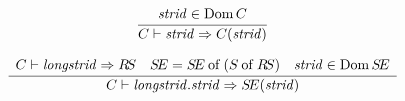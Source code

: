 


%



\begin{equation}	%
\label{idlongstrid-rule}
\frac{\begin{array}{lr}
	\strid\in\Dom \C
      \end{array}}
     {\C\ts\idlongid{\strid}\ra\C(\strid)}
\end{equation}

\begin{equation}	%
\label{dotlongstrid-rule}
\frac{\begin{array}{lcr}
      \C\ts\longstrid\ra\RS & 
      \SE = \of{\SE}{(\of{\S}{\RS})} &
      \strid\in\Dom\SE
      \end{array}
      }
     {\C\ts\dotlongid{\longstrid}{\strid}\ra\SE(\strid)}
\end{equation}

